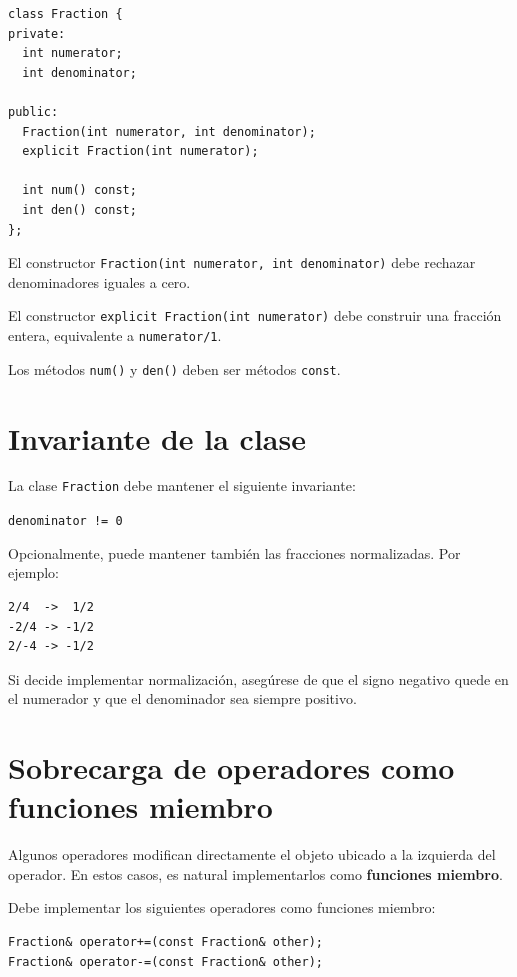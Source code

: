 \documentclass[11pt,a4paper]{article}
\begin{document}
\begin{lstlisting}
class Fraction {
private:
  int numerator;
  int denominator;

public:
  Fraction(int numerator, int denominator);
  explicit Fraction(int numerator);

  int num() const;
  int den() const;
};
\end{lstlisting}

El constructor \lstinline|Fraction(int numerator, int denominator)| debe rechazar denominadores iguales a cero.

El constructor \lstinline|explicit Fraction(int numerator)| debe construir una fracción entera, equivalente a \lstinline|numerator/1|.

Los métodos \lstinline|num()| y \lstinline|den()| deben ser métodos \lstinline|const|.

\section{Invariante de la clase}

La clase \lstinline|Fraction| debe mantener el siguiente invariante:

\begin{center}
\lstinline|denominator != 0|
\end{center}

Opcionalmente, puede mantener también las fracciones normalizadas. Por ejemplo:

\begin{lstlisting}[language={}]
2/4  ->  1/2
-2/4 -> -1/2
2/-4 -> -1/2
\end{lstlisting}

Si decide implementar normalización, asegúrese de que el signo negativo quede en el numerador y que el denominador sea siempre positivo.

\section{Sobrecarga de operadores como funciones miembro}

Algunos operadores modifican directamente el objeto ubicado a la izquierda del operador. En estos casos, es natural implementarlos como \textbf{funciones miembro}.

Debe implementar los siguientes operadores como funciones miembro:

\begin{lstlisting}
Fraction& operator+=(const Fraction& other);
Fraction& operator-=(const Fraction& other);
\end{lstlisting}
\end{document}
